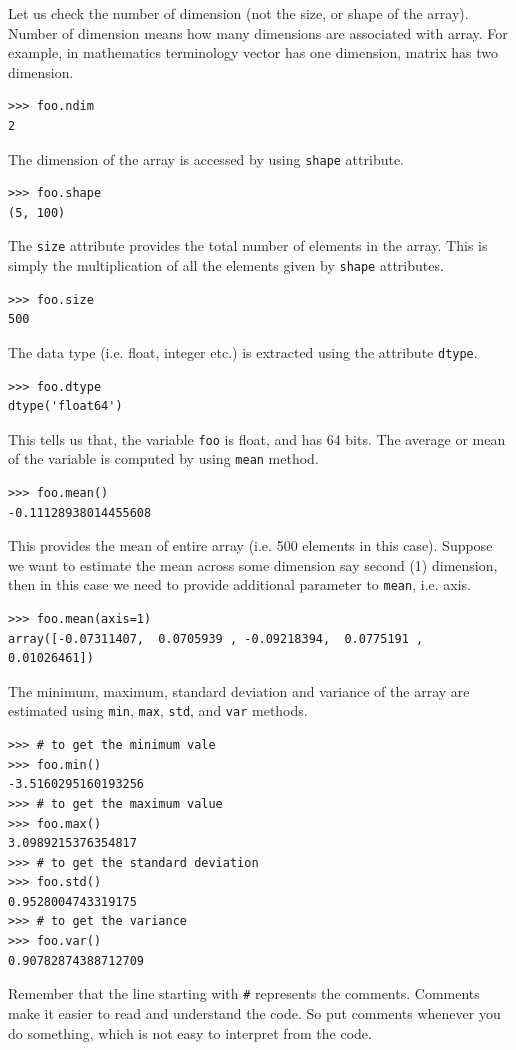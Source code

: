 \documentclass[10pt]{book}
\begin{document}
{Let us check the number of dimension (not the size, or shape of the array). Number of dimension means how many dimensions are associated with array. For example, in mathematics terminology vector has one dimension, matrix has two dimension. 
\beforeverb \begin{verbatim}
>>> foo.ndim			
2
\end{verbatim} \afterverb
The dimension of the array is accessed by using \verb"shape" attribute.
\beforeverb \begin{verbatim}
>>> foo.shape
(5, 100)
\end{verbatim} \afterverb
The \verb"size" attribute provides the total number of elements in the array. This is simply the multiplication of all the elements given by \verb"shape" attributes. 
\beforeverb \begin{verbatim}
>>> foo.size
500
\end{verbatim} \afterverb
The data type (i.e. float, integer etc.) is extracted using the attribute \verb"dtype".
\beforeverb \begin{verbatim}
>>> foo.dtype
dtype('float64')
\end{verbatim} \afterverb
This tells us that, the variable \verb"foo" is float, and has 64 bits. The average or mean of the variable is computed by using \verb"mean" method.
\beforeverb \begin{verbatim}
>>> foo.mean()
-0.11128938014455608
\end{verbatim} \afterverb
This provides the mean of entire array (i.e. 500 elements in this case). Suppose we want to estimate the mean across some dimension say second (1) dimension, then in this case we need to provide additional parameter to \verb"mean", i.e. axis.
\beforeverb \begin{verbatim}
>>> foo.mean(axis=1)
array([-0.07311407,  0.0705939 , -0.09218394,  0.0775191 ,  0.01026461])
\end{verbatim} \afterverb
The minimum, maximum, standard deviation and variance of the array are estimated using \verb"min", \verb"max", \verb"std", and \verb"var" methods.
\beforeverb \begin{verbatim}
>>> # to get the minimum vale
>>> foo.min()
-3.5160295160193256
>>> # to get the maximum value 
>>> foo.max()
3.0989215376354817
>>> # to get the standard deviation
>>> foo.std()
0.9528004743319175
>>> # to get the variance
>>> foo.var()
0.90782874388712709
\end{verbatim} \afterverb
Remember that the line starting with \verb"#" represents the comments. Comments make it easier to read and understand the code. So put comments whenever you do something, which is not easy to interpret from the code. \\

}
\end{document}
